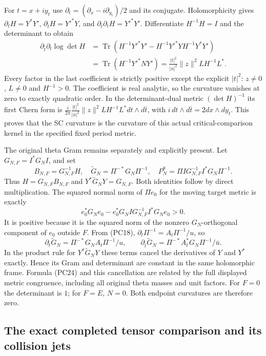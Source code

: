 For $t=x+iy_t$ use
$\partial_t=(\partial_x-i\partial_{y_t})/2$ and its conjugate.
Holomorphicity gives $\partial_tH=Y^*Y'$,
$\partial_{\bar t}H=Y'^*Y$, and
$\partial_{\bar t}\partial_tH=Y'^*Y'$.
Differentiate $H^{-1}H=I$ and the determinant to obtain
\[
\begin{split}
 \partial_{\bar t}\partial_t\log\det H
 &=\operatorname{Tr}(H^{-1}Y'^*Y'
     -H^{-1}Y'^*YH^{-1}Y^*Y')\\
 &=\operatorname{Tr}(H^{-1}Y'^*NY')
   =\frac{|t|^2}{|u|^2}\|z\|^2 L H^{-1}L^*.
\end{split}\tag{PC24}
\]
Every factor in the last coefficient is strictly positive except the
explicit $|t|^2$: $z\ne0$, $L\ne0$ and $H^{-1}>0$.
The coefficient is real analytic, so the curvature vanishes at zero
to exactly quadratic order.  In the determinant-dual metric
$(\det H)^{-1}$ its first Chern form is
$\frac{i}{2\pi}\frac{|t|^2}{|u|^2}\|z\|^2LH^{-1}L^*
dt\wedge d\bar t$, with $i\,dt\wedge d\bar t=2dx\wedge dy_t$.
This proves that the SC curvature is the curvature of this actual
critical-comparison kernel in the specified fixed period metric.

The original theta Gram remains separately and explicitly present.
Let $G_{N,F}=I^*G_NI$, and set
\[
 B_{N,F}=G_{N,F}^{-1}H,\quad
 \widetilde G_N=\Pi^{-*}G_N\Pi^{-1},\quad
 P_N^\theta=\Pi I G_{N,F}^{-1}I^*G_N\Pi^{-1}.
 \tag{PC25}
\]
Thus $H=G_{N,F}B_{N,F}$ and
$Y^*\widetilde G_NY=G_{N,F}$.  Both identities follow by direct
multiplication.  The squared normal norm of $\Pi e_0$ for the
moving target metric is exactly
\[
 e_0^*G_Ne_0-e_0^*G_NI G_{N,F}^{-1}I^*G_Ne_0>0.
 \tag{PC26}
\]
It is positive because it is the squared norm of the nonzero
$G_N$-orthogonal component of $e_0$ outside $F$.  From (PC18),
$\partial_t\Pi^{-1}=A_t\Pi^{-1}/u$, so
\[
 \partial_t\widetilde G_N=\Pi^{-*}G_NA_t\Pi^{-1}/u,
 \qquad
 \partial_{\bar t}\widetilde G_N=
       \Pi^{-*}A_t^*G_N\Pi^{-1}/\bar u.
 \tag{PC27}
\]
In the product rule for $Y^*\widetilde G_NY$ these terms cancel
the derivatives of $Y$ and $Y^*$ exactly.  Hence its Gram and
determinant are constant in the same holomorphic frame.  Formula
(PC24) and this cancellation are related by the full displayed
metric congruence, including all original theta masses and unit factors.
For $F=0$ the determinant is $1$; for $F=E$, $N=0$.
Both endpoint curvatures are therefore zero.

\subsection{The exact completed tensor comparison and its collision jets}

